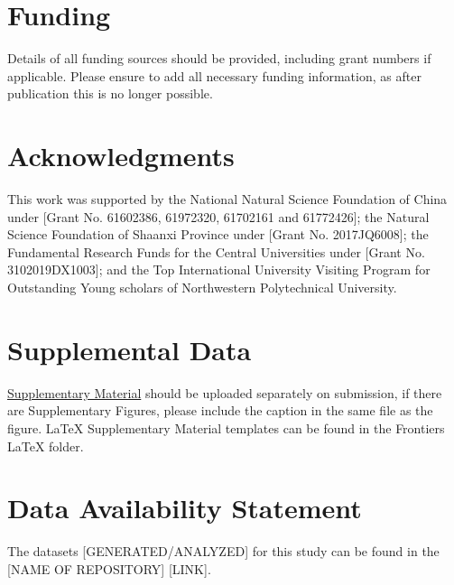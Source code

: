 \documentclass[utf8]{frontiersSCNS} %
\begin{document}
\section*{Funding}
Details of all funding sources should be provided, including grant numbers if applicable. Please ensure to add all necessary funding information, as after publication this is no longer possible.

\section*{Acknowledgments}
This work was supported by the National Natural Science Foundation of China under [Grant No. 61602386, 61972320, 61702161 and 61772426]; 
the Natural Science Foundation of Shaanxi Province under [Grant No. 2017JQ6008]; 
the Fundamental Research Funds for the Central Universities under [Grant No. 3102019DX1003];  
and the Top International University Visiting Program for Outstanding Young scholars of Northwestern Polytechnical University.


\section*{Supplemental Data}
 \href{http://home.frontiersin.org/about/author-guidelines#SupplementaryMaterial}{Supplementary Material} should be uploaded separately on submission, if there are Supplementary Figures, please include the caption in the same file as the figure. LaTeX Supplementary Material templates can be found in the Frontiers LaTeX folder.

\section*{Data Availability Statement}
The datasets [GENERATED/ANALYZED] for this study can be found in the [NAME OF REPOSITORY] [LINK].



\end{document}
